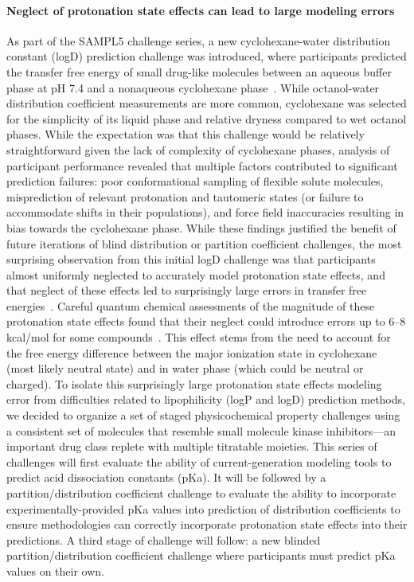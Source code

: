 \documentclass[9pt,lineno]{elife}
\begin{document}
\paragraph{Neglect of protonation state effects can lead to large modeling errors}

As part of the SAMPL5 challenge series, a new cyclohexane-water distribution constant (logD) prediction challenge was introduced, where participants predicted the transfer free energy of small drug-like molecules between an aqueous buffer phase at pH 7.4 and a nonaqueous cyclohexane phase~\citep{bannan_blind_2016,rustenburg_measuring_2016}. 
While octanol-water distribution coefficient measurements are more common, cyclohexane was selected for the simplicity of its liquid phase and relative dryness compared to wet octanol phases.
While the expectation was that this challenge would be relatively straightforward given the lack of complexity of cyclohexane phases, analysis of participant performance revealed that multiple factors contributed to significant prediction failures: poor conformational sampling of flexible solute molecules, misprediction of relevant protonation and tautomeric states (or failure to accommodate shifts in their populations), and force field inaccuracies resulting in bias towards the cyclohexane phase.
While these findings justified the benefit of future iterations of blind distribution or partition coefficient challenges, the most surprising observation from this initial logD challenge was that participants almost uniformly neglected to accurately model protonation state effects, and that neglect of these effects led to surprisingly large errors in transfer free energies~\citep{bannan_blind_2016, pickard_blind_2016,rustenburg_measuring_2016}. 
Careful quantum chemical assessments of the magnitude of these protonation state effects found that their neglect could introduce errors up to 6--8 kcal/mol for some compounds~\citep{pickard_blind_2016}. This effect stems from the need to account for the free energy difference between the major ionization state in cyclohexane (most likely neutral state) and in water phase (which could be neutral or charged). 
To isolate this surprisingly large protonation state effects modeling error from difficulties related to lipophilicity (logP and logD) prediction methods, we decided to organize a set of staged physicochemical property challenges using a consistent set of molecules that resemble small molecule kinase inhibitors---an important drug class replete with multiple titratable moieties.
This series of challenges will first evaluate the ability of current-generation modeling tools to predict acid dissociation constants (pKa). It will be followed by a partition/distribution coefficient challenge to evaluate the ability to incorporate experimentally-provided pKa values into prediction of distribution coefficients to ensure methodologies can correctly incorporate protonation state effects into their predictions. A third stage of challenge will follow: a new blinded partition/distribution coefficient challenge where participants must predict pKa values on their own.
\end{document}
